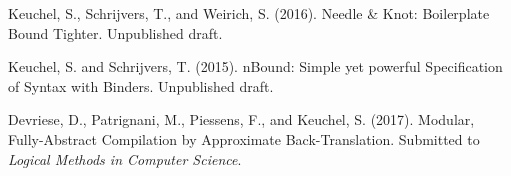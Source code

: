 {\begin{center}
  \begin{minipage}{0.85\columnwidth}
    Keuchel, S.,  Schrijvers, T., and Weirich, S. (2016).
    \newblock Needle {\&} {K}not: {B}oilerplate {B}ound {T}ighter.
    \newblock Unpublished draft.
  \end{minipage}
\end{center}

\begin{center}
  \begin{minipage}{0.85\columnwidth}
    Keuchel, S. and Schrijvers, T. (2015).
    n{B}ound: {S}imple yet powerful {S}pecification of {S}yntax
      with {B}inders.
    \newblock Unpublished draft.
  \end{minipage}
\end{center}

\begin{center}
  \begin{minipage}{0.85\columnwidth}
    Devriese, D., Patrignani, M., Piessens, F., and Keuchel, S. (2017).
    \newblock Modular, {F}ully-{A}bstract {C}ompilation by {A}pproximate
      {B}ack-{T}ranslation.
    \newblock Submitted to {\em Logical Methods in Computer Science}.
  \end{minipage}
\end{center}





} %









